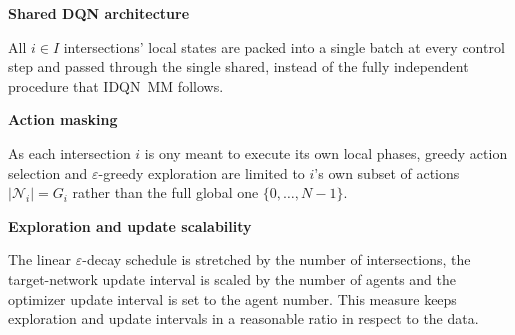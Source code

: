 \medskip

\noindent \textbf{Shared DQN architecture}

\noindent All $i \in I$ intersections' local states are packed into a single batch at every control step and passed through the single shared, instead of the fully independent procedure that IDQN~MM follows.

\medskip

\noindent \textbf{Action masking}

\noindent As each intersection $i$ is ony meant to execute its own local phases, greedy action selection and $\varepsilon$-greedy exploration are limited to $i$'s own subset of actions $|\mathcal{N}_i|=G_i$ rather than the full global one $\{0,\dots,N-1\}$.

\medskip

\noindent \textbf{Exploration and update scalability}

\noindent The linear $\varepsilon$-decay schedule is stretched by the number of intersections, the target-network update interval is scaled by the number of agents and the optimizer update interval is set to the agent number. This measure keeps exploration and update intervals in a reasonable ratio in respect to the data.